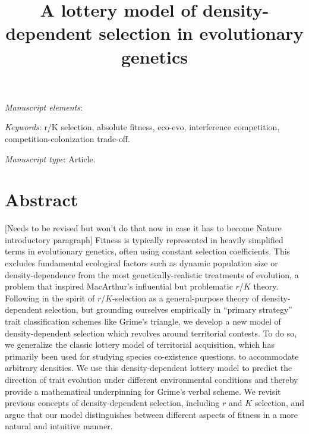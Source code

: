 \documentclass[11pt]{article}
\title{A lottery model of density-dependent selection in evolutionary genetics}
\date{}
\begin{document}
\maketitle




\bigskip

\textit{Manuscript elements}: 

\bigskip

\textit{Keywords}: r/K selection, absolute fitness, eco-evo, interference competition, competition-colonization trade-off.

\bigskip

\textit{Manuscript type}: Article. 

\bigskip


\linenumbers{}
\modulolinenumbers[3]

\newpage{}

\section*{Abstract}

[Needs to be revised but won't do that now in case it has to become Nature introductory paragraph]
Fitness is typically represented in heavily simplified terms in evolutionary genetics, often using constant selection coefficients. This excludes fundamental ecological factors such as dynamic population size or density-dependence from the most genetically-realistic treatments of evolution, a problem that inspired MacArthur's influential but problematic $r$/$K$ theory. Following in the spirit of $r$/$K$-selection as a general-purpose theory of density-dependent selection, but grounding ourselves empirically in ``primary strategy'' trait classification schemes like Grime's triangle, we develop a new model of density-dependent selection which revolves around territorial contests. To do so, we generalize the classic lottery model of territorial acquisition, which has primarily been used for studying species co-existence questions, to accommodate arbitrary densities. We use this density-dependent lottery model to predict the direction of trait evolution under different environmental conditions and thereby provide a mathematical underpinning for Grime's verbal scheme. We revisit previous concepts of density-dependent selection, including $r$ and $K$ selection, and argue that our model distinguishes between different aspects of fitness in a more natural and intuitive manner.
\end{document}
